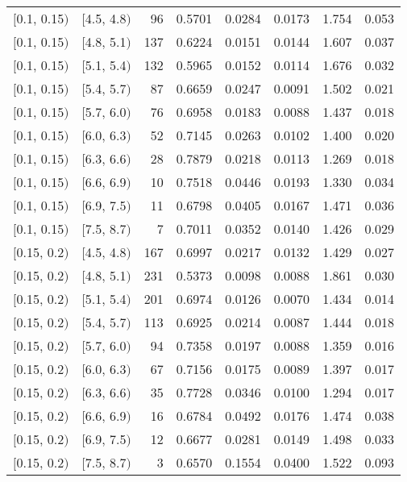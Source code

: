 \begin{longtable}{| l | l | r | r | r | r | r | r |}
        $[$0.1, 0.15$)$ & $[$4.5, 4.8$)$ & 96 & 0.5701 & 0.0284 & 0.0173 & 1.754 & 0.053 \\
        $[$0.1, 0.15$)$ & $[$4.8, 5.1$)$ & 137 & 0.6224 & 0.0151 & 0.0144 & 1.607 & 0.037 \\
        $[$0.1, 0.15$)$ & $[$5.1, 5.4$)$ & 132 & 0.5965 & 0.0152 & 0.0114 & 1.676 & 0.032 \\
        $[$0.1, 0.15$)$ & $[$5.4, 5.7$)$ & 87 & 0.6659 & 0.0247 & 0.0091 & 1.502 & 0.021 \\
        $[$0.1, 0.15$)$ & $[$5.7, 6.0$)$ & 76 & 0.6958 & 0.0183 & 0.0088 & 1.437 & 0.018 \\
        $[$0.1, 0.15$)$ & $[$6.0, 6.3$)$ & 52 & 0.7145 & 0.0263 & 0.0102 & 1.400 & 0.020 \\
        $[$0.1, 0.15$)$ & $[$6.3, 6.6$)$ & 28 & 0.7879 & 0.0218 & 0.0113 & 1.269 & 0.018 \\
        $[$0.1, 0.15$)$ & $[$6.6, 6.9$)$ & 10 & 0.7518 & 0.0446 & 0.0193 & 1.330 & 0.034 \\
        $[$0.1, 0.15$)$ & $[$6.9, 7.5$)$ & 11 & 0.6798 & 0.0405 & 0.0167 & 1.471 & 0.036 \\
        $[$0.1, 0.15$)$ & $[$7.5, 8.7$)$ & 7 & 0.7011 & 0.0352 & 0.0140 & 1.426 & 0.029 \\
        $[$0.15, 0.2$)$ & $[$4.5, 4.8$)$ & 167 & 0.6997 & 0.0217 & 0.0132 & 1.429 & 0.027 \\
        $[$0.15, 0.2$)$ & $[$4.8, 5.1$)$ & 231 & 0.5373 & 0.0098 & 0.0088 & 1.861 & 0.030 \\
        $[$0.15, 0.2$)$ & $[$5.1, 5.4$)$ & 201 & 0.6974 & 0.0126 & 0.0070 & 1.434 & 0.014 \\
        $[$0.15, 0.2$)$ & $[$5.4, 5.7$)$ & 113 & 0.6925 & 0.0214 & 0.0087 & 1.444 & 0.018 \\
        $[$0.15, 0.2$)$ & $[$5.7, 6.0$)$ & 94 & 0.7358 & 0.0197 & 0.0088 & 1.359 & 0.016 \\
        $[$0.15, 0.2$)$ & $[$6.0, 6.3$)$ & 67 & 0.7156 & 0.0175 & 0.0089 & 1.397 & 0.017 \\
        $[$0.15, 0.2$)$ & $[$6.3, 6.6$)$ & 35 & 0.7728 & 0.0346 & 0.0100 & 1.294 & 0.017 \\
        $[$0.15, 0.2$)$ & $[$6.6, 6.9$)$ & 16 & 0.6784 & 0.0492 & 0.0176 & 1.474 & 0.038 \\
        $[$0.15, 0.2$)$ & $[$6.9, 7.5$)$ & 12 & 0.6677 & 0.0281 & 0.0149 & 1.498 & 0.033 \\
        $[$0.15, 0.2$)$ & $[$7.5, 8.7$)$ & 3 & 0.6570 & 0.1554 & 0.0400 & 1.522 & 0.093 \\

\end{longtable}

